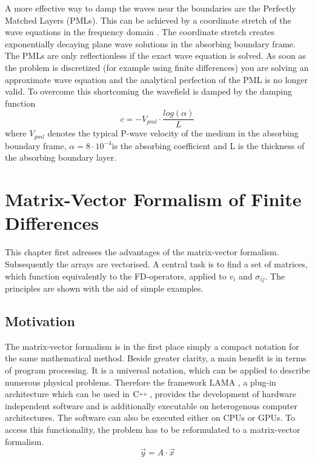\documentclass[pdftex,a4paper,parskip,listof=totoc,bibliography=totoc,onehalfspacing,12pt]{scrreprt}
\newcommand{\CC}[1][]{$\text{C\hspace{0ex}}^{_{_{_{++}}}}					%
                      \ifthenelse{\equal{#1}{}}{}{\text{\hspace{-.625ex}#1}}$}
\begin{document}
A more effective way to damp the waves near the boundaries are the Perfectly Matched Layers (PMLs). This can be achieved by a coordinate stretch of the wave equations in the frequency domain \citep{berenger1994perfectly,roden2000convolution,komatitsch2007unsplit}. The coordinate stretch creates exponentially decaying plane wave solutions in the absorbing boundary frame. The PMLs are only reflectionless if the exact wave equation is solved. As soon as the problem is discretized (for example using finite differences) you are solving an approximate wave equation and the analytical perfection of the PML is no longer valid. To overcome this shortcoming the wavefield is damped by the damping function 
\begin{equation}
	c=-V_{pml} \cdot \frac{log(\alpha)}{L}
\end{equation}
where $V_{pml}$ denotes the typical P-wave velocity of the medium in the absorbing boundary frame, $\alpha=8 \cdot 10^{-4}$is the absorbing coefficient and L is the thickness of the absorbing boundary layer.

\cleardoublepage
\chapter{Matrix-Vector Formalism of Finite Differences}
This chapter first adresses the advantages of the matrix-vector formalism. Subsequently the arrays are vectorised. A central task is to find a set of matrices, which function equivalently to the FD-operators, applied to $v_i$ and $\sigma_{ij}$. The principles are shown with the aid of simple examples. 
\section{Motivation}
The matrix-vector formalism is in the first place simply a compact notation for the same mathematical method. Beside greater clarity, a main benefit is in terms of program processing. It is a universal notation, which can be applied to describe numerous physical problems. Therefore the framework LAMA \citep{scai2016lama}, a plug-in architecture which can be used in \CC, provides the development of hardware independent software and is additionally executable on heterogenous computer architectures. The software can also be executed either on CPUs or GPUs. To access this functionality, the problem has to be reformulated to a matrix-vector formalism. 
\begin{equation}
	\vec{y} = A\cdot\vec{x}
\end{equation}
\end{document}
